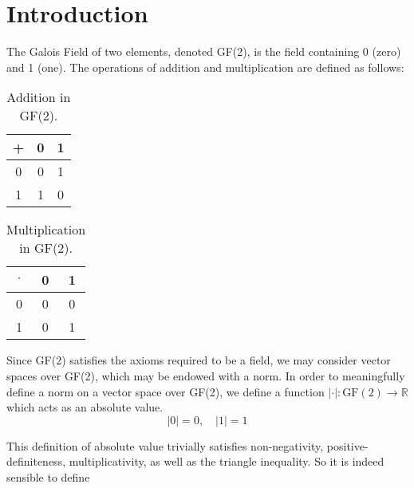 \documentclass{article}
\theoremstyle{plain}
\begin{document}
    \section*{Introduction}
    \normalsize
    The Galois Field of two elements, denoted GF(2), is the field
    containing 0 (zero) and 1 (one). The operations of
    addition and multiplication are defined as follows:
    \par
    \begin{minipage}[b]{0.4\textwidth}
        \centering
        \begin{table}[H]
            \centering
            \begin{tabular}{c|cc}
                +&0&1\\
                \hline
                0&0&1\\
                1&1&0
            \end{tabular}
            \caption{Addition in GF(2).}
            \label{tab:Addition_In_F2}
        \end{table}
    \end{minipage}
    \hfill
    \begin{minipage}[b]{0.4\textwidth}
        \centering
        \begin{table}[H]
            \centering
            \begin{tabular}{c|cc}
                $\cdot$&0&1\\
                \hline
                0&0&0\\
                1&0&1
            \end{tabular}
            \caption{Multiplication in GF(2).}
            \label{tab:Multiplication_In_F2}
        \end{table}
    \end{minipage}
    \par
    Since GF(2) satisfies the axioms required to be a field, we may consider
    vector spaces over GF(2), which may be endowed with a norm. In order to
    meaningfully define a norm on a vector space over GF(2), we define a
    function $|\cdot|:\mathrm{GF(2)}\rightarrow\mathbb{R}$
    which acts as an absolute value.
    \begin{equation}
        |0|=0,\quad|1|=1
    \end{equation}
    \par
    This definition of absolute value trivially satisfies
    non-negativity, positive-definiteness, multiplicativity, as well
    as the triangle inequality. So it is indeed sensible to define
\end{document}
